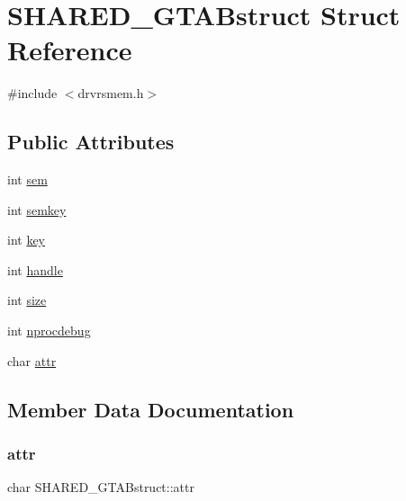 \hypertarget{struct_s_h_a_r_e_d___g_t_a_bstruct}{}\section{S\+H\+A\+R\+E\+D\+\_\+\+G\+T\+A\+Bstruct Struct Reference}
\label{struct_s_h_a_r_e_d___g_t_a_bstruct}


{\ttfamily \#include $<$drvrsmem.\+h$>$}

\subsection*{Public Attributes}
\begin{DoxyCompactItemize}
\item 
int \hyperlink{struct_s_h_a_r_e_d___g_t_a_bstruct_a8b2da5e329bee95cb13ebeb0240d3b5f}{sem}
\item 
int \hyperlink{struct_s_h_a_r_e_d___g_t_a_bstruct_a393f8328cdc24dccb445301127cfaf0b}{semkey}
\item 
int \hyperlink{struct_s_h_a_r_e_d___g_t_a_bstruct_a2b59beeb35ffb2155d604f7e8ece1e77}{key}
\item 
int \hyperlink{struct_s_h_a_r_e_d___g_t_a_bstruct_a6011dd7077220653ad471058fb97507a}{handle}
\item 
int \hyperlink{struct_s_h_a_r_e_d___g_t_a_bstruct_ae8b13310266f59cfe5a01254c9da80ed}{size}
\item 
int \hyperlink{struct_s_h_a_r_e_d___g_t_a_bstruct_a86e66dfd55aa9fb6c6d8549e73075876}{nprocdebug}
\item 
char \hyperlink{struct_s_h_a_r_e_d___g_t_a_bstruct_af79369323f118689b48d6a99ce09af1d}{attr}
\end{DoxyCompactItemize}


\subsection{Member Data Documentation}
\mbox{\label{struct_s_h_a_r_e_d___g_t_a_bstruct_af79369323f118689b48d6a99ce09af1d}} 
\subsubsection{\texorpdfstring{attr}{attr}}
{\footnotesize\ttfamily char S\+H\+A\+R\+E\+D\+\_\+\+G\+T\+A\+Bstruct\+::attr}

